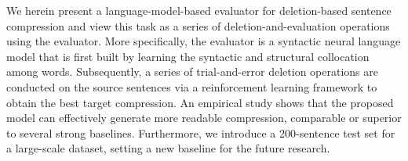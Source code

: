 We herein present a language-model-based evaluator for deletion-based sentence compression and view this task as a series of deletion-and-evaluation operations using the evaluator. More specifically, the evaluator is a syntactic neural language model that is first built by learning the syntactic and structural collocation among words. Subsequently, a series of trial-and-error deletion operations are conducted on the source sentences via a reinforcement learning framework to obtain the best target compression. An empirical study shows that the proposed model can effectively generate more readable compression, comparable or superior to several strong baselines. Furthermore, we introduce a 200-sentence test set for a large-scale dataset, setting a new baseline for the future research.

